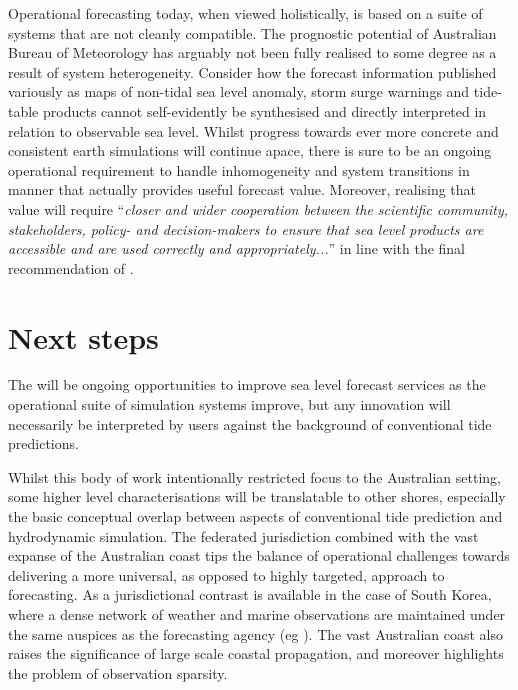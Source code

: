 Operational forecasting today, when viewed holistically, is based on a suite of systems that are not cleanly compatible.
The prognostic potential of Australian Bureau of Meteorology has arguably not been fully realised to some degree as a result of system heterogeneity.  Consider how the forecast information published variously as maps of non-tidal sea level anomaly, storm surge warnings and tide-table products cannot self-evidently be synthesised and directly interpreted in relation to observable sea level.
Whilst progress towards ever more concrete and consistent earth simulations will continue apace, there is sure to be an ongoing operational requirement to handle inhomogeneity and system transitions in manner that actually provides useful forecast value. Moreover, realising that value will require ``\textit{closer and wider cooperation between the scientific community, stakeholders, policy- and decision-makers to ensure that sea level products are accessible and are used correctly and appropriately...}'' in line with the final recommendation of \citet{10.1175/bams-89-4-459}. 

\section{Next steps}
The will be ongoing opportunities to improve sea level forecast services as the operational suite of simulation systems improve, but any innovation will necessarily be interpreted by users against the background of conventional tide predictions.

Whilst this body of work intentionally restricted focus to the Australian setting, some higher level  characterisations will be translatable to other shores, especially the basic conceptual overlap between aspects of conventional tide prediction and hydrodynamic simulation.
The federated jurisdiction combined with the vast expanse of the Australian coast tips the balance of operational challenges towards delivering a more universal, as opposed to highly targeted, approach to forecasting.   As a jurisdictional contrast is available in the case of South Korea, where a dense network of weather and marine observations are maintained under the same auspices as the forecasting agency (eg   
\citep{Suh:2015fy}).
The vast Australian coast also raises the significance of large scale coastal propagation, and moreover highlights the problem of observation sparsity.


